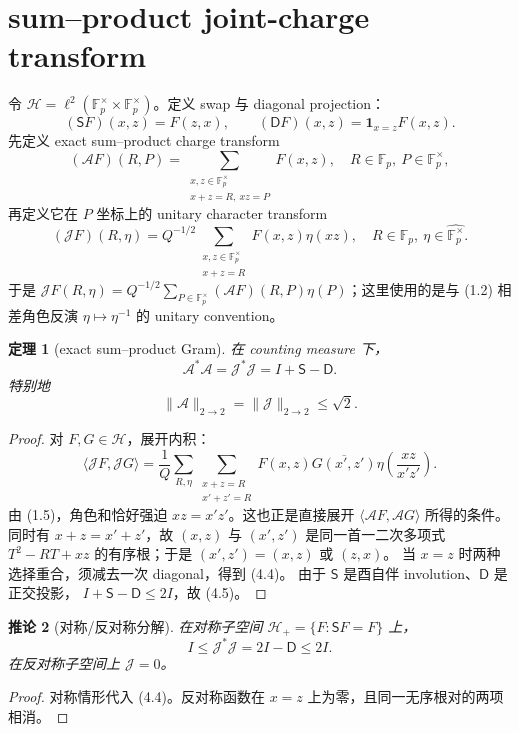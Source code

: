 \documentclass[11pt,a4paper]{ctexart}
\newtheorem{theorem}{定理}[section]
\newtheorem{corollary}[theorem]{推论}
\theoremstyle{definition}
\newcommand{\F}{\mathbb F}
\newcommand{\G}{\F_p^\times}
\newcommand{\Gh}{\widehat{\G}}
\newcommand{\1}{\mathbf 1}
\begin{document}
\section{sum--product joint-charge transform}

令 $\mathscr H=\ell^2(\G\times\G)$。定义 swap 与 diagonal projection：
\[
(\mathsf SF)(x,z)=F(z,x),\qquad
(\mathsf DF)(x,z)=\1_{x=z}F(x,z).
\tag{4.1}
\]
先定义 exact sum--product charge transform
\[
(\mathcal AF)(R,P)
=\sum_{\substack{x,z\in\G\\x+z=R,\ xz=P}}F(x,z),
\quad R\in\F_p,\ P\in\G,
\tag{4.2}
\]
再定义它在 $P$ 坐标上的 unitary character transform
\[
(\mathcal JF)(R,\eta)
=Q^{-1/2}\sum_{\substack{x,z\in\G\\x+z=R}}
F(x,z)\eta(xz),
\quad R\in\F_p,\ \eta\in\Gh.
\tag{4.3}
\]
于是
\(
\mathcal JF(R,\eta)=Q^{-1/2}\sum_{P\in\G}(\mathcal AF)(R,P)\eta(P)
\)；这里使用的是与 (1.2) 相差角色反演 $\eta\mapsto\eta^{-1}$ 的
unitary convention。

\begin{theorem}[exact sum--product Gram]
在 counting measure 下，
\[
\boxed{\mathcal A^*\mathcal A
=\mathcal J^*\mathcal J=I+\mathsf S-\mathsf D.}
\tag{4.4}
\]
特别地
\[
\boxed{\|\mathcal A\|_{2\to2}
=\|\mathcal J\|_{2\to2}\le\sqrt2.}
\tag{4.5}
\]
\end{theorem}

\begin{proof}
对 $F,G\in\mathscr H$，展开内积：
\[
\langle\mathcal JF,\mathcal JG\rangle
=\frac1Q\sum_{R,\eta}
\sum_{\substack{x+z=R\\x'+z'=R}}
F(x,z)\overline{G(x',z')}
\eta\!\left(\frac{xz}{x'z'}\right).
\]
由 (1.5)，角色和恰好强迫 $xz=x'z'$。这也正是直接展开
$\langle\mathcal AF,\mathcal AG\rangle$ 所得的条件。同时有
$x+z=x'+z'$，故 $(x,z)$ 与 $(x',z')$ 是同一首一二次多项式
$T^2-RT+xz$ 的有序根；于是 $(x',z')=(x,z)$ 或 $(z,x)$。
当 $x=z$ 时两种选择重合，须减去一次 diagonal，得到 (4.4)。
由于 $\mathsf S$ 是酉自伴 involution、$\mathsf D$ 是正交投影，
$I+\mathsf S-\mathsf D\le2I$，故 (4.5)。
\end{proof}

\begin{corollary}[对称/反对称分解]
在对称子空间 $\mathscr H_+=\{F:\mathsf SF=F\}$ 上，
\[
I\le\mathcal J^*\mathcal J=2I-\mathsf D\le2I.
\tag{4.6}
\]
在反对称子空间上 $\mathcal J=0$。
\end{corollary}

\begin{proof}
对称情形代入 (4.4)。反对称函数在 $x=z$ 上为零，且同一无序根对的两项相消。
\end{proof}
\end{document}
